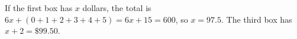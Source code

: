 If the first box has $x$ dollars, the total is $6x+(0+1+2+3+4+5)=6x+15=600$, so $x=97.5$. The third box has $x+2=\boxed{\$99.50}$.
